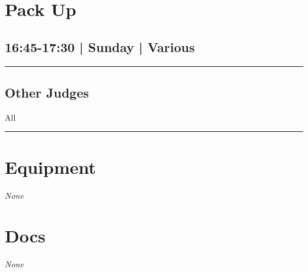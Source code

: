 \documentclass[10pt, A5]{article}
\begin{document}
        \begin{framed}
        \begin{minipage}{\textwidth}

        \setcounter{section}{93}
        \section{Pack Up}
        \subsection*{16:45-17:30 | Sunday | Various}

        \vspace{0.25cm}
        \hrule
        \vspace{0.25cm}


        \subsection*{Other Judges}
                    All

            \vspace{0.25cm}
        \hrule
        \vspace{0.25cm}

        \begin{multicols}{2}

		\section*{\faWrench \: Equipment}

				\textit{None}
		
		\vfill\null
		\columnbreak

			\section*{\faFile \: Docs}
		 	\textit{None}
	

		\vfill\null

		\end{multicols}
\end{minipage}
\end{framed}
\end{document}
